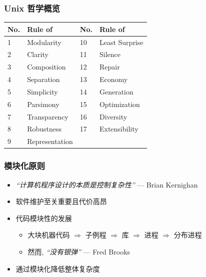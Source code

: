 \documentclass[compress]{beamer}
\begin{document}
\begin{frame}
\frametitle{Unix 哲学概览}

\begin{tabular}{|l|p{0.3\hsize}||l|p{0.3\hsize}|}
\hline

\rule[-2mm]{0mm}{10mm}\bfseries No. & \bfseries Rule of & \bfseries No. & \bfseries Rule of \\
\hline\hline

1 & Modularity & 10 & Least Surprise \\ \hline

2 & Clarity & 11 & Silence \\ \hline

3 & Composition & 12 & Repair \\ \hline

4 & Separation & 13 & Economy \\ \hline

5 & Simplicity & 14 & Generation \\ \hline

6 & Parsimony & 15 & Optimization \\ \hline

7 & Transparency & 16 & Diversity \\ \hline

8 & Robustness & 17 &Extensibility \\ \hline

9 & Representation & & \\ \hline

\end{tabular}


\end{frame}

\begin{frame}
\frametitle{模块化原则}

\begin{itemize}
\item \emph{``计算机程序设计的本质是控制复杂性''} --- Brian Kernighan

\item 软件维护至关重要且代价高昂

\item 代码模块性的发展
    \begin{itemize}
    \item 大块机器代码
 $\Longrightarrow$ 子例程 $\Longrightarrow$ 库 
$\Longrightarrow$ 进程 $\Longrightarrow$ 分布进程
    \item 然而, \emph{``没有银弹''} --- Fred Brooks
    \end{itemize}
  \item 通过模块化降低整体复杂度
\end{itemize}
\end{frame}
\end{document}
